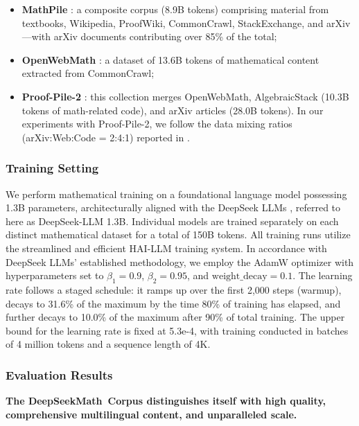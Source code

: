 \begin{itemize}[topsep=0pt]
    \item \textbf{MathPile} \citep{mathpile}: a composite corpus (8.9B tokens) comprising material from textbooks, Wikipedia, ProofWiki, CommonCrawl, StackExchange, and arXiv—with arXiv documents contributing over 85\% of the total;
    \item \textbf{OpenWebMath} \citep{openwebmath}: a dataset of 13.6B tokens of mathematical content extracted from CommonCrawl;
    \item \textbf{Proof-Pile-2} \citep{llemma}: this collection merges OpenWebMath, AlgebraicStack (10.3B tokens of math-related code), and arXiv articles (28.0B tokens). In our experiments with Proof-Pile-2, we follow the data mixing ratios (arXiv:Web:Code = 2:4:1) reported in \cite{llemma}.
\end{itemize}

\subsubsection{Training Setting}
\label{sec:quality-policy}
We perform mathematical training on a foundational language model possessing 1.3B parameters, architecturally aligned with the DeepSeek LLMs \citep{deepseek-llm}, referred to here as DeepSeek-LLM 1.3B. Individual models are trained separately on each distinct mathematical dataset for a total of 150B tokens. All training runs utilize the streamlined and efficient HAI-LLM \citep{haillm} training system. In accordance with DeepSeek LLMs’ established methodology, we employ the AdamW optimizer \citep{adamW} with hyperparameters set to $\beta_1=0.9$, $\beta_2=0.95$, and $\mathrm{weight\_decay}=0.1$. The learning rate follows a staged schedule: it ramps up over the first 2,000 steps (warmup), decays to 31.6\% of the maximum by the time 80\% of training has elapsed, and further decays to 10.0\% of the maximum after 90\% of total training. The upper bound for the learning rate is fixed at 5.3e-4, with training conducted in batches of 4 million tokens and a sequence length of 4K.

\subsubsection{Evaluation Results}

\textbf{The DeepSeekMath~Corpus distinguishes itself with high quality, comprehensive multilingual content, and unparalleled scale.}

